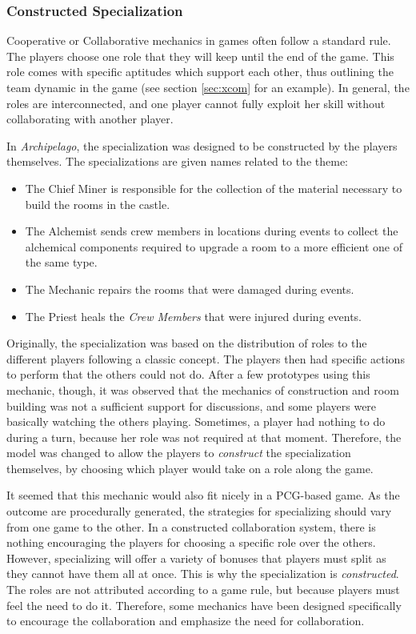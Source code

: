 \subsubsection{Constructed Specialization}
Cooperative or Collaborative mechanics in games often follow a standard rule. The players choose one role that they will keep until the end of the game. This role comes with specific aptitudes which support each other, thus outlining the team dynamic in the game (see section \ref{sec:xcom} for an example). In general, the roles are interconnected, and one player cannot fully exploit her skill without collaborating with another player.

In \textit{Archipelago}, the specialization was designed to be constructed by the players themselves. The specializations are given names related to the theme:
\begin{itemize}
\item The Chief Miner is responsible for the collection of the material necessary to build the rooms in the castle. 
\item The Alchemist sends crew members in locations during events to collect the alchemical components required to upgrade a room to a more efficient one of the same type.
\item The Mechanic repairs the rooms that were damaged during events.
\item The Priest heals the \textit{Crew Members} that were injured during events.
\end{itemize}
Originally, the specialization was based on the distribution of roles to the different players following a classic concept. The players then had specific actions to perform that the others could not do. After a few prototypes using this mechanic, though, it was observed that the mechanics of construction and room building was not a sufficient support for discussions, and some players were basically watching the others playing. Sometimes, a player had nothing to do during a turn, because her role was not required at that moment. Therefore, the model was changed to allow the players to \textit{construct} the specialization themselves, by choosing which player would take on a role along the game.

It seemed that this mechanic would also fit nicely in a PCG-based game. As the outcome are procedurally generated, the strategies for specializing should vary from one game to the other. In a constructed collaboration system, there is nothing encouraging the players for choosing a specific role over the others. However, specializing will offer a variety of bonuses that players must split as they cannot have them all at once. This is why the specialization is \textit{constructed}. The roles are not attributed according to a game rule, but because players must feel the need to do it. Therefore, some mechanics have been designed specifically to encourage the collaboration and emphasize the need for collaboration.
